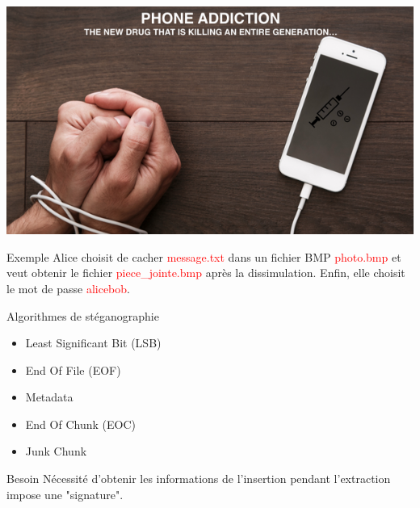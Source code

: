 \documentclass{beamer}
\begin{document}
  \begin{frame} %
	\hspace{1.7cm}
    \includegraphics[scale=0.5]{ANGS3/addiction.png}
	
	\begin{exampleblock}{Exemple} 
	Alice choisit de cacher \textcolor{red}{message.txt} dans un fichier 
	BMP \textcolor{red}{photo.bmp} et veut obtenir le fichier 
	\textcolor{red}{piece\_jointe.bmp} après la 
	dissimulation. Enfin, elle choisit le mot de passe \textcolor{red}{alicebob}. 
	\end{exampleblock}
  \end{frame}
  
    \begin{frame} %
	\begin{block}{Algorithmes de stéganographie}
	\begin{itemize}
	[circle]
	\item Least Significant Bit (LSB)
	\item End Of File (EOF)
	\item Metadata
	\item End Of Chunk (EOC)
	\item Junk Chunk 
	\end{itemize}
	\end{block}
	
	\begin{alertblock}{Besoin} 
	Nécessité d'obtenir les informations de l'insertion pendant l'extraction
	impose une "signature".
	\end{alertblock}

  \end{frame}
  
\end{document}
